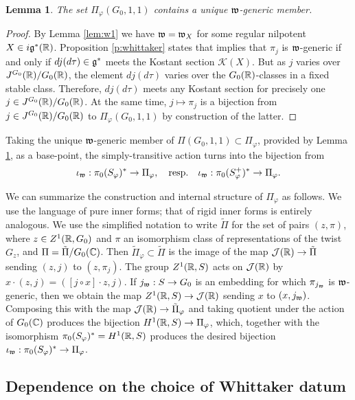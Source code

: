 \documentclass{article}
\newtheorem{lem}[thm]{Lemma}
\theoremstyle{definition}
\numberwithin{equation}{section}
\renewcommand{\-}{\hyp{}}
\newcommand{\K}{\mathcal K}
\begin{document}
\begin{lem} \label{lem:uniqgen}
The set $\Pi_\varphi(G_0,1,1)$ contains a unique $\mathfrak{w}$-generic member.
\end{lem}
\begin{proof}
By Lemma \ref{lem:w1} we have $\mathfrak{w}=\mathfrak{w}_X$ for some regular nilpotent $X \in i\mathfrak{g}^*(\mathbb{R})$. Proposition \ref{p:whittaker} states that implies that $\pi_j$ is $\mathfrak{w}$-generic if and only if $dj(d\tau) \in \mathfrak{g}^*$ meets the  Kostant section $\K(X)$. But as $j$ varies over $J^{G_0}(\mathbb{R})/G_0(\mathbb{R})$, the element $dj(d\tau)$ varies over the $G_0(\mathbb{R})$-classes in a fixed stable class. Therefore, $dj(d\tau)$ meets any Kostant section for precisely one $j \in J^{G_0}(\mathbb{R})/G_0(\mathbb{R})$. At the same time, $j \mapsto \pi_j$ is a bijection from $j \in J^{G_0}(\mathbb{R})/G_0(\mathbb{R})$ to $\Pi_\varphi(G_0,1,1)$ by construction of the latter.
\end{proof}

Taking the unique $\mathfrak{w}$-generic member of $\Pi(G_0,1,1) \subset \Pi_\varphi$, provided by Lemma \ref{lem:uniqgen}, as a base-point, the simply-transitive action turns into the bijection from 
\[ \iota_{\mathfrak{w}} : \pi_0(S_\varphi)^* \to  \Pi_\varphi, \quad \textrm{resp.}\quad \iota_{\mathfrak{w}} : \pi_0(S_\varphi^+)^* \to \Pi_\varphi. \]

We can summarize the construction and internal structure of $\Pi_\varphi$ as follows. We use the language of pure inner forms; that of rigid inner forms is entirely analogous. We use the simplified notation to write $\tilde\Pi$ for the set of pairs $(z,\pi)$, where $z \in Z^1(\mathbb{R},G_0)$ and $\pi$ an isomorphism class of representations of the twist $G_z$, and $\Pi=\tilde\Pi/G_0(\mathbb{C})$. Then $\tilde\Pi_\varphi \subset \tilde\Pi$ is the image of the map $\mathcal{J}(\mathbb{R}) \to \tilde\Pi$ sending $(z,j)$ to $(z,\pi_j)$. The group $Z^1(\mathbb{R},S)$ acts on $\mathcal{J}(\mathbb{R})$ by $x\cdot (z,j)=([j \circ x] \cdot z,j)$. If $j_{\mathfrak{w}} : S \to G_0$ is an embedding for which $\pi_{j_{\mathfrak{w}}}$ is $\mathfrak{w}$-generic, then we obtain the map $Z^1(\mathbb{R},S) \to \mathcal{J}(\mathbb{R})$ sending $x$ to $(x,j_{\mathfrak{w}})$. Composing this with the map $\mathcal{J}(\mathbb{R}) \to \tilde\Pi_\varphi$ and taking quotient under the action of $G_0(\mathbb{C})$ produces the bijection $H^1(\mathbb{R},S) \to \Pi_\varphi$, which, together with the isomorphism $\pi_0(S_\varphi)^*=H^1(\mathbb{R},S)$ produces the desired bijection $\iota_{\mathfrak{w}} : \pi_0(S_\varphi)^* \to \Pi_\varphi$.

\subsection{Dependence on the choice of Whittaker datum} \label{sub:whitdep}
\end{document}
